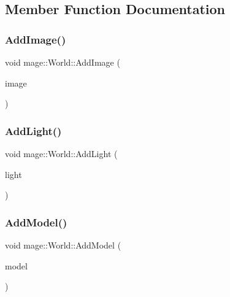 \subsection{Member Function Documentation}
\hypertarget{classmage_1_1_world_a06eff1a6d063c8ae067ab81de4f1b555}{}\label{classmage_1_1_world_a06eff1a6d063c8ae067ab81de4f1b555} 
\subsubsection{\texorpdfstring{Add\+Image()}{AddImage()}}
{\footnotesize\ttfamily void mage\+::\+World\+::\+Add\+Image (\begin{DoxyParamCaption}\item[{\hyperlink{namespacemage_a1e01ae66713838a7a67d30e44c67703e}{Shared\+Ptr}$<$ \hyperlink{classmage_1_1_sprite_image}{Sprite\+Image} $>$}]{image }\end{DoxyParamCaption})}

\hypertarget{classmage_1_1_world_ab0c31d3113ea264fed8b8ef034047c91}{}\label{classmage_1_1_world_ab0c31d3113ea264fed8b8ef034047c91} 
\subsubsection{\texorpdfstring{Add\+Light()}{AddLight()}}
{\footnotesize\ttfamily void mage\+::\+World\+::\+Add\+Light (\begin{DoxyParamCaption}\item[{\hyperlink{namespacemage_a1e01ae66713838a7a67d30e44c67703e}{Shared\+Ptr}$<$ \hyperlink{classmage_1_1_point_light}{Point\+Light} $>$}]{light }\end{DoxyParamCaption})}

\hypertarget{classmage_1_1_world_a4b7287a11ff316b029ec7727ed0d076d}{}\label{classmage_1_1_world_a4b7287a11ff316b029ec7727ed0d076d} 
\subsubsection{\texorpdfstring{Add\+Model()}{AddModel()}}
{\footnotesize\ttfamily void mage\+::\+World\+::\+Add\+Model (\begin{DoxyParamCaption}\item[{\hyperlink{namespacemage_a1e01ae66713838a7a67d30e44c67703e}{Shared\+Ptr}$<$ \hyperlink{classmage_1_1_model}{Model} $>$}]{model }\end{DoxyParamCaption})}

